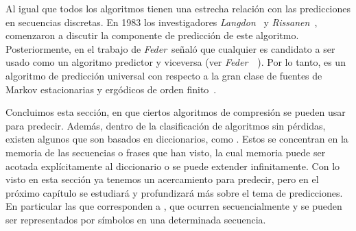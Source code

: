 Al igual que todos los algoritmos \losslessdatacompression tienen una estrecha relación con las predicciones en secuencias discretas. En 1983 los investigadores \emph{Langdon}~\cite{Langdon1983} y \emph{Rissanen}~\cite{Rissanen1983}, comenzaron a discutir la componente de predicción de este algoritmo. Posteriormente, en el trabajo de \emph{Feder}~\etal señaló que cualquier \LDC es candidato a ser usado como un algoritmo predictor y viceversa (ver \emph{Feder}~\etal~\cite{Feder1992}). Por lo tanto, \lzSieteOcho es un algoritmo de predicción universal con respecto a la gran clase de fuentes de Markov estacionarias y ergódicos de orden finito~\cite{Begleiter2004}.

	




\uncm
Concluimos esta sección, en que ciertos algoritmos de compresión se pueden usar para predecir. Además, dentro de la clasificación de algoritmos sin pérdidas, existen algunos que son basados en diccionarios, como \lzSieteOcho. Estos se concentran en la memoria de las secuencias o frases que han visto, la cual memoria puede ser acotada explícitamente al diccionario o se puede extender infinitamente. Con lo visto en esta sección ya tenemos un acercamiento para predecir, pero en el próximo capítulo se estudiará y profundizará más sobre el tema de predicciones. En particular las que corresponden a \webasccesslog, que ocurren secuencialmente y se pueden ser representados por símbolos en una determinada secuencia.




